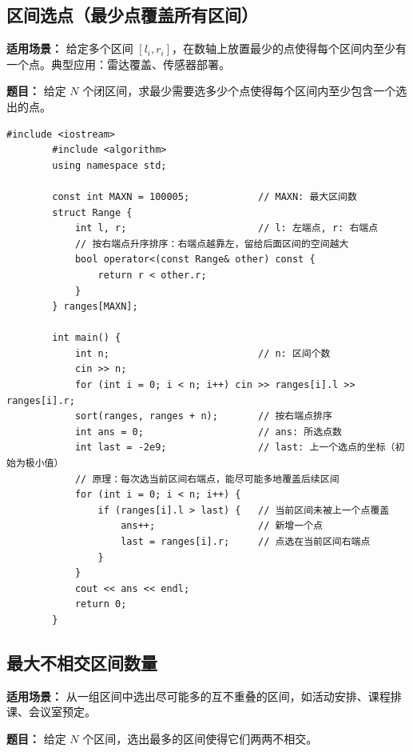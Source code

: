 \documentclass[12pt,a4paper]{ctexart}
\begin{document}
	\subsection{区间选点（最少点覆盖所有区间）}
	\textbf{适用场景：} 给定多个区间 \([l_i, r_i]\)，在数轴上放置最少的点使得每个区间内至少有一个点。典型应用：雷达覆盖、传感器部署。
	
	\textbf{题目：} 给定 \(N\) 个闭区间，求最少需要选多少个点使得每个区间内至少包含一个选出的点。
	
	\begin{lstlisting}[caption={贪心——按右端点排序，每次选右端点}]
		#include <iostream>
		#include <algorithm>
		using namespace std;
		
		const int MAXN = 100005;            // MAXN: 最大区间数
		struct Range {
			int l, r;                       // l: 左端点, r: 右端点
			// 按右端点升序排序：右端点越靠左，留给后面区间的空间越大
			bool operator<(const Range& other) const {
				return r < other.r;
			}
		} ranges[MAXN];
		
		int main() {
			int n;                          // n: 区间个数
			cin >> n;
			for (int i = 0; i < n; i++) cin >> ranges[i].l >> ranges[i].r;
			sort(ranges, ranges + n);       // 按右端点排序
			int ans = 0;                    // ans: 所选点数
			int last = -2e9;                // last: 上一个选点的坐标（初始为极小值）
			// 原理：每次选当前区间右端点，能尽可能多地覆盖后续区间
			for (int i = 0; i < n; i++) {
				if (ranges[i].l > last) {   // 当前区间未被上一个点覆盖
					ans++;                  // 新增一个点
					last = ranges[i].r;     // 点选在当前区间右端点
				}
			}
			cout << ans << endl;
			return 0;
		}
	\end{lstlisting}
	
	\subsection{最大不相交区间数量}
	\textbf{适用场景：} 从一组区间中选出尽可能多的互不重叠的区间，如活动安排、课程排课、会议室预定。
	
	\textbf{题目：} 给定 \(N\) 个区间，选出最多的区间使得它们两两不相交。
	
\end{document}
